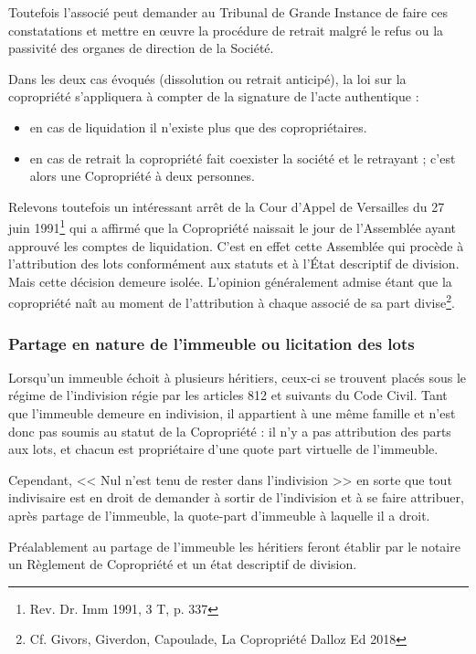 			Toutefois l'associé peut demander au Tribunal de Grande Instance de faire ces constatations et mettre en œuvre la procédure de retrait malgré le refus ou la passivité des organes de direction de la Société.
			
			Dans les deux cas évoqués (dissolution ou retrait anticipé), la loi sur la copropriété s'appliquera à compter de la signature de l'acte authentique :
			\begin{itemize}
				\item en cas de liquidation il n'existe plus que des copropriétaires.
				\item en cas de retrait la copropriété fait coexister la société et le retrayant ; c'est alors une Copropriété à deux personnes.
			\end{itemize}
		
			Relevons toutefois un intéressant arrêt de la Cour d'Appel de Versailles du 27 juin 1991\footnote{Rev. Dr. Imm 1991, 3\degre{} T, p. 337} qui a affirmé que la Copropriété naissait le jour de l'Assemblée ayant approuvé les comptes de liquidation. C'est en effet cette Assemblée qui procède à l'attribution des lots conformément aux statuts et à l’État descriptif de division. Mais cette décision demeure isolée. L’opinion généralement admise étant que la copropriété naît au moment de l’attribution à chaque associé de sa part divise\footnote{Cf. Givors, Giverdon, Capoulade, La Copropriété Dalloz Ed 2018 }.
		
		\subsubsection{Partage en nature de l'immeuble ou licitation des lots}
		
			Lorsqu'un immeuble échoit à plusieurs héritiers, ceux-ci se trouvent placés sous le régime de l'indivision régie par les articles 812 et suivants du Code Civil. Tant que l'immeuble demeure en indivision, il appartient à une même famille et n'est donc pas soumis au statut de la Copropriété : il n’y a pas attribution des parts aux lots, et chacun est propriétaire d’une quote part virtuelle de l’immeuble.
			
			Cependant, << Nul n'est tenu de rester dans l'indivision >> en sorte que tout indivisaire est en droit de demander à sortir de l'indivision et à se faire attribuer, après partage de l'immeuble, la quote-part d'immeuble à laquelle il a droit.
			
			Préalablement au partage de l'immeuble les héritiers feront établir par le notaire un Règlement de Copropriété et un état descriptif de division.
			
